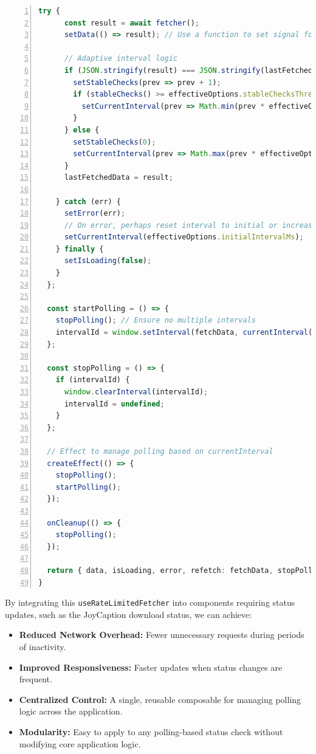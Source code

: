 \documentclass[10pt]{article}
\begin{document}
\begin{lstlisting}[language=TypeScript, basicstyle=\small\ttfamily, numbers=left, xleftmargin=1em, xrightmargin=1em, breaklines=true]
    try {
      const result = await fetcher();
      setData(() => result); // Use a function to set signal for direct access to value

      // Adaptive interval logic
      if (JSON.stringify(result) === JSON.stringify(lastFetchedData)) {
        setStableChecks(prev => prev + 1);
        if (stableChecks() >= effectiveOptions.stableChecksThreshold) {
          setCurrentInterval(prev => Math.min(prev * effectiveOptions.increaseFactor, effectiveOptions.maxIntervalMs));
        }
      } else {
        setStableChecks(0);
        setCurrentInterval(prev => Math.max(prev * effectiveOptions.decreaseFactor, effectiveOptions.minIntervalMs));
      }
      lastFetchedData = result;

    } catch (err) {
      setError(err);
      // On error, perhaps reset interval to initial or increase more aggressively
      setCurrentInterval(effectiveOptions.initialIntervalMs);
    } finally {
      setIsLoading(false);
    }
  };

  const startPolling = () => {
    stopPolling(); // Ensure no multiple intervals
    intervalId = window.setInterval(fetchData, currentInterval());
  };

  const stopPolling = () => {
    if (intervalId) {
      window.clearInterval(intervalId);
      intervalId = undefined;
    }
  };

  // Effect to manage polling based on currentInterval
  createEffect(() => {
    stopPolling();
    startPolling();
  });

  onCleanup(() => {
    stopPolling();
  });

  return { data, isLoading, error, refetch: fetchData, stopPolling, startPolling };
}

\end{lstlisting}
By integrating this \texttt{useRateLimitedFetcher} into components requiring status updates, such as the JoyCaption download status, we can achieve:

\begin{itemize}
    \item \textbf{Reduced Network Overhead:} Fewer unnecessary requests during periods of inactivity.
    \item \textbf{Improved Responsiveness:} Faster updates when status changes are frequent.
    \item \textbf{Centralized Control:} A single, reusable composable for managing polling logic across the application.
    \item \textbf{Modularity:} Easy to apply to any polling-based status check without modifying core application logic.
\end{itemize}
\end{document}
